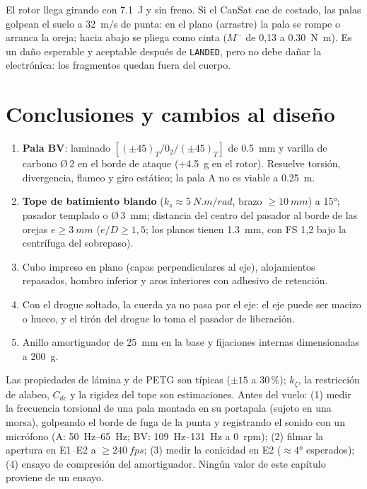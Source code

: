 \begin{nota}
El rotor llega girando con \SI{7.1}{J} y sin freno. Si el CanSat cae de costado, las palas
golpean el suelo a \SI{32}{m/s} de punta: en el plano (arrastre) la pala se rompe o
arranca la oreja; hacia abajo se pliega como cinta ($M^-$ de 0,13 a \SI{0.30}{N.m}). Es
un daño esperable y aceptable después de \texttt{LANDED}, pero no debe dañar la
electrónica: los fragmentos quedan fuera del cuerpo.
\end{nota}

\section{Conclusiones y cambios al diseño}\label{sec:estructura-conclusiones}

\begin{resultado}
\begin{enumerate}[leftmargin=*]
  \item \textbf{Pala BV}: laminado $[(\pm45)_T/0_2/(\pm45)_T]$ de \SI{0.5}{mm} y varilla
        de carbono Ø\,2 en el borde de ataque (+\SI{4.5}{g} en el rotor). Resuelve torsión,
        divergencia, flameo y giro estático; la pala A no es viable a \SI{0.25}{m}.
  \item \textbf{Tope de batimiento blando} ($k_s\approx\SI{5}{N.m/rad}$, brazo
        $\ge\SI{10}{mm}$) a \ang{+15}; pasador templado o Ø\,\SI{3}{mm}; distancia del
        centro del pasador al borde de las orejas $e\ge\SI{3}{mm}$ ($e/D\ge1{,}5$; los
        planos tienen \SI{1.3}{mm}, con FS 1,2 bajo la centrífuga del sobrepaso).
  \item Cubo impreso en plano (capas perpendiculares al eje), alojamientos repasados,
        hombro inferior y aros interiores con adhesivo de retención.
  \item Con el drogue soltado, la cuerda ya no pasa por el eje: el eje puede ser macizo o
        hueco, y el tirón del drogue lo toma el pasador de liberación.
  \item Anillo amortiguador de \SI{25}{mm} en la base y fijaciones internas dimensionadas a
        \SI{200}{g}.
\end{enumerate}
\end{resultado}

\begin{nota}
Las propiedades de lámina y de PETG son típicas ($\pm15$ a 30\,\%); $k_\zeta$, la
restricción de alabeo, $C_{dc}$ y la rigidez del tope son estimaciones. Antes del vuelo:
(1) medir la frecuencia torsional de una pala montada en su portapala (sujeto en una
morsa), golpeando el borde de fuga de la punta y registrando el sonido con un micrófono (A: \SIrange{50}{65}{Hz}; BV: \SIrange{109}{131}{Hz} a \SI{0}{rpm});
(2) filmar la apertura en E1--E2 a $\ge\SI{240}{fps}$; (3) medir la conicidad en E2
($\approx\ang{4}$ esperados); (4) ensayo de compresión del amortiguador. Ningún
valor de este capítulo proviene de un ensayo.
\end{nota}
